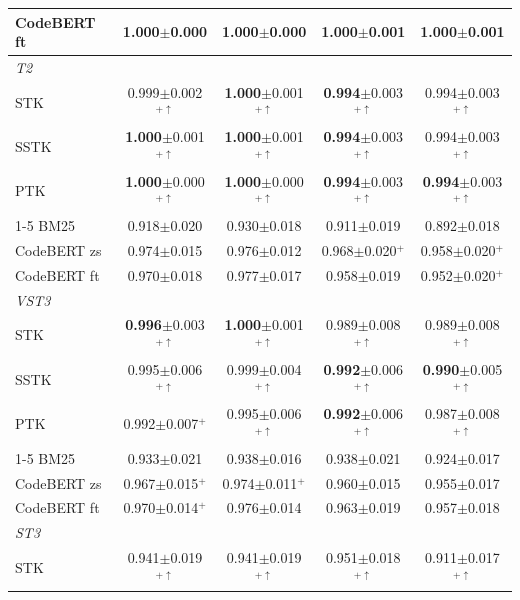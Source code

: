 \begin{table}[!htbp]
\begin{tabular}{lcccc}
\quad CodeBERT ft & \textbf{1.000}$\pm$0.000 & \textbf{1.000}$\pm$0.000 & \textbf{1.000}$\pm$0.001 & \textbf{1.000}$\pm$0.001 \\
\midrule
\multicolumn{5}{l}{\emph{T2}} \\
\quad STK & 0.999$\pm$0.002$^{+\uparrow}$ & \textbf{1.000}$\pm$0.001$^{+\uparrow}$ & \textbf{0.994}$\pm$0.003$^{+\uparrow}$ & 0.994$\pm$0.003$^{+\uparrow}$ \\
\quad SSTK & \textbf{1.000}$\pm$0.001$^{+\uparrow}$ & \textbf{1.000}$\pm$0.001$^{+\uparrow}$ & \textbf{0.994}$\pm$0.003$^{+\uparrow}$ & 0.994$\pm$0.003$^{+\uparrow}$ \\
\quad PTK & \textbf{1.000}$\pm$0.000$^{+\uparrow}$ & \textbf{1.000}$\pm$0.000$^{+\uparrow}$ & \textbf{0.994}$\pm$0.003$^{+\uparrow}$ & \textbf{0.994}$\pm$0.003$^{+\uparrow}$ \\
\cmidrule(lr){1-5}
\quad BM25 & 0.918$\pm$0.020 & 0.930$\pm$0.018 & 0.911$\pm$0.019 & 0.892$\pm$0.018 \\
\quad CodeBERT zs & 0.974$\pm$0.015 & 0.976$\pm$0.012 & 0.968$\pm$0.020$^{+}$ & 0.958$\pm$0.020$^{+}$ \\
\quad CodeBERT ft & 0.970$\pm$0.018 & 0.977$\pm$0.017 & 0.958$\pm$0.019 & 0.952$\pm$0.020$^{+}$ \\
\midrule
\multicolumn{5}{l}{\emph{VST3}} \\
\quad STK & \textbf{0.996}$\pm$0.003$^{+\uparrow}$ & \textbf{1.000}$\pm$0.001$^{+\uparrow}$ & 0.989$\pm$0.008$^{+\uparrow}$ & 0.989$\pm$0.008$^{+\uparrow}$ \\
\quad SSTK & 0.995$\pm$0.006$^{+\uparrow}$ & 0.999$\pm$0.004$^{+\uparrow}$ & \textbf{0.992}$\pm$0.006$^{+\uparrow}$ & \textbf{0.990}$\pm$0.005$^{+\uparrow}$ \\
\quad PTK & 0.992$\pm$0.007$^{+}$ & 0.995$\pm$0.006$^{+\uparrow}$ & \textbf{0.992}$\pm$0.006$^{+\uparrow}$ & 0.987$\pm$0.008$^{+\uparrow}$ \\
\cmidrule(lr){1-5}
\quad BM25 & 0.933$\pm$0.021 & 0.938$\pm$0.016 & 0.938$\pm$0.021 & 0.924$\pm$0.017 \\
\quad CodeBERT zs & 0.967$\pm$0.015$^{+}$ & 0.974$\pm$0.011$^{+}$ & 0.960$\pm$0.015 & 0.955$\pm$0.017 \\
\quad CodeBERT ft & 0.970$\pm$0.014$^{+}$ & 0.976$\pm$0.014 & 0.963$\pm$0.019 & 0.957$\pm$0.018 \\
\midrule
\multicolumn{5}{l}{\emph{ST3}} \\
\quad STK & 0.941$\pm$0.019$^{+\uparrow}$ & 0.941$\pm$0.019$^{+\uparrow}$ & 0.951$\pm$0.018$^{+\uparrow}$ & 0.911$\pm$0.017$^{+\uparrow}$ \\

\end{tabular}
\end{table}
